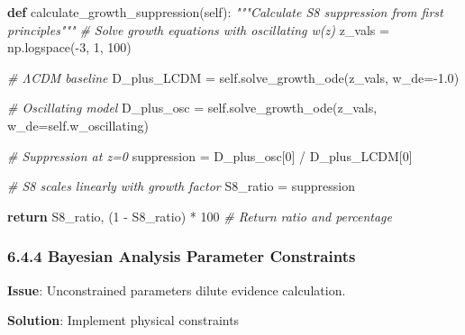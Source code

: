 \documentclass[
  11pt,
]{report}
\newenvironment{Shaded}{}{}
\newcommand{\CommentTok}[1]{\textcolor[rgb]{0.38,0.63,0.69}{\textit{#1}}}
\newcommand{\ControlFlowTok}[1]{\textcolor[rgb]{0.00,0.44,0.13}{\textbf{#1}}}
\newcommand{\DecValTok}[1]{\textcolor[rgb]{0.25,0.63,0.44}{#1}}
\newcommand{\FloatTok}[1]{\textcolor[rgb]{0.25,0.63,0.44}{#1}}
\newcommand{\KeywordTok}[1]{\textcolor[rgb]{0.00,0.44,0.13}{\textbf{#1}}}
\newcommand{\NormalTok}[1]{#1}
\newcommand{\OperatorTok}[1]{\textcolor[rgb]{0.40,0.40,0.40}{#1}}
\newcommand{\VariableTok}[1]{\textcolor[rgb]{0.10,0.09,0.49}{#1}}
\begin{document}
\begin{Shaded}
\begin{Highlighting}[]
\KeywordTok{def}\NormalTok{ calculate\_growth\_suppression(}\VariableTok{self}\NormalTok{):}
    \CommentTok{"""Calculate S8 suppression from first principles"""}
    \CommentTok{\# Solve growth equations with oscillating w(z)}
\NormalTok{    z\_vals }\OperatorTok{=}\NormalTok{ np.logspace(}\OperatorTok{{-}}\DecValTok{3}\NormalTok{, }\DecValTok{1}\NormalTok{, }\DecValTok{100}\NormalTok{)}
    
    \CommentTok{\# ΛCDM baseline}
\NormalTok{    D\_plus\_LCDM }\OperatorTok{=} \VariableTok{self}\NormalTok{.solve\_growth\_ode(z\_vals, w\_de}\OperatorTok{={-}}\FloatTok{1.0}\NormalTok{)}
    
    \CommentTok{\# Oscillating model}
\NormalTok{    D\_plus\_osc }\OperatorTok{=} \VariableTok{self}\NormalTok{.solve\_growth\_ode(z\_vals, w\_de}\OperatorTok{=}\VariableTok{self}\NormalTok{.w\_oscillating)}
    
    \CommentTok{\# Suppression at z=0}
\NormalTok{    suppression }\OperatorTok{=}\NormalTok{ D\_plus\_osc[}\DecValTok{0}\NormalTok{] }\OperatorTok{/}\NormalTok{ D\_plus\_LCDM[}\DecValTok{0}\NormalTok{]}
    
    \CommentTok{\# S8 scales linearly with growth factor}
\NormalTok{    S8\_ratio }\OperatorTok{=}\NormalTok{ suppression}
    
    \ControlFlowTok{return}\NormalTok{ S8\_ratio, (}\DecValTok{1} \OperatorTok{{-}}\NormalTok{ S8\_ratio) }\OperatorTok{*} \DecValTok{100}  \CommentTok{\# Return ratio and percentage}
\end{Highlighting}
\end{Shaded}

\subsubsection{6.4.4 Bayesian Analysis Parameter
Constraints}\label{bayesian-analysis-parameter-constraints}

\textbf{Issue}: Unconstrained parameters dilute evidence calculation.

\textbf{Solution}: Implement physical constraints
\end{document}
